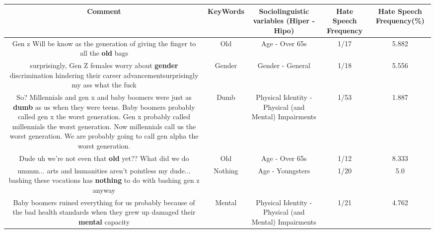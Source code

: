 \documentclass[11pt]{article}
\newlength\mylength
\begin{document}
\begin{center}
\setlength\mylength{\dimexpr\textwidth - 1\arrayrulewidth - 50\tabcolsep}
\begin{longtable}{|C{.65\mylength}|C{.30\mylength}|C{.12\mylength}|C{.12\mylength}|C{.12\mylength}|}
\hline
\textbf{Comment} & \textbf{KeyWords} & \textbf{Sociolinguistic variables (Hiper - Hipo)}  & \textbf{Hate Speech Frequency} & \textbf{Hate Speech Frequency(\%)} \\
\hline{}\small Gen z Will be know as the generation of giving the finger to all the \textbf{old} bags\normalsize   & Old & Age - Over 65s & 1/17 & 5.882 \\  \hline
  \small surprisingly, Gen Z females worry about \textbf{gender} discrimination hindering their career advancementsurprisingly my ass what the fuck\normalsize   & Gender & Gender - General & 1/18 & 5.556 \\  \hline
  \small So? Millennials and gen x and baby boomers were just as \textbf{dumb} as us when they were teens. Baby boomers probably called gen x the worst generation. Gen x probably called millennials the worst generation. Now millennials call us the worst generation. We are probably going to call gen alpha the worst generation.\normalsize   & Dumb & Physical Identity - Physical (and Mental) Impairments & 1/53 & 1.887 \\  \hline
  \small Dude uh we're not even that \textbf{old} yet?? What did we do\normalsize   & Old & Age - Over 65s & 1/12 & 8.333 \\  \hline
  \small ummm... arts and humanities aren't pointless my dude... bashing these vocations has \textbf{nothing} to do with bashing gen z anyway\normalsize   & Nothing & Age - Youngsters & 1/20 & 5.0 \\  \hline
  \small Baby boomers ruined everything for us probably because of the bad health standards when they grew up damaged their \textbf{mental} capacity\normalsize   & Mental & Physical Identity - Physical (and Mental) Impairments & 1/21 & 4.762 \\  \hline

\end{longtable}
\end{center}
\end{document}
